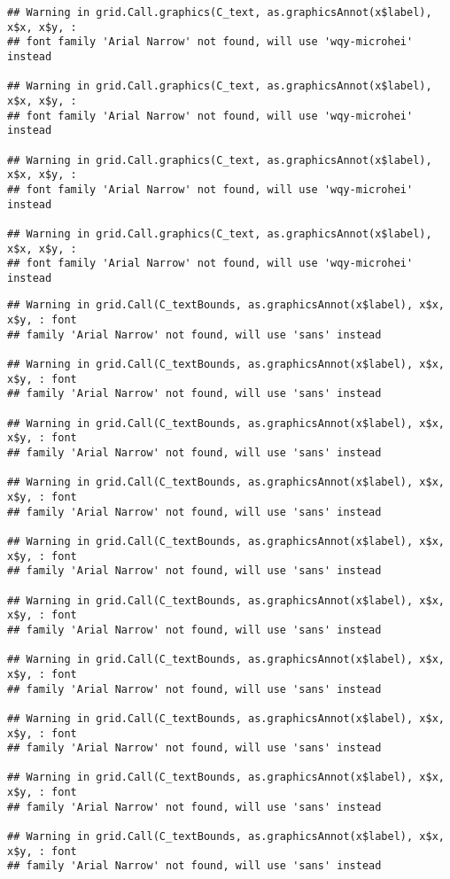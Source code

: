 \documentclass[
]{article}
\begin{document}
\begin{verbatim}
## Warning in grid.Call.graphics(C_text, as.graphicsAnnot(x$label), x$x, x$y, :
## font family 'Arial Narrow' not found, will use 'wqy-microhei' instead

## Warning in grid.Call.graphics(C_text, as.graphicsAnnot(x$label), x$x, x$y, :
## font family 'Arial Narrow' not found, will use 'wqy-microhei' instead

## Warning in grid.Call.graphics(C_text, as.graphicsAnnot(x$label), x$x, x$y, :
## font family 'Arial Narrow' not found, will use 'wqy-microhei' instead

## Warning in grid.Call.graphics(C_text, as.graphicsAnnot(x$label), x$x, x$y, :
## font family 'Arial Narrow' not found, will use 'wqy-microhei' instead
\end{verbatim}

\begin{verbatim}
## Warning in grid.Call(C_textBounds, as.graphicsAnnot(x$label), x$x, x$y, : font
## family 'Arial Narrow' not found, will use 'sans' instead

## Warning in grid.Call(C_textBounds, as.graphicsAnnot(x$label), x$x, x$y, : font
## family 'Arial Narrow' not found, will use 'sans' instead

## Warning in grid.Call(C_textBounds, as.graphicsAnnot(x$label), x$x, x$y, : font
## family 'Arial Narrow' not found, will use 'sans' instead

## Warning in grid.Call(C_textBounds, as.graphicsAnnot(x$label), x$x, x$y, : font
## family 'Arial Narrow' not found, will use 'sans' instead

## Warning in grid.Call(C_textBounds, as.graphicsAnnot(x$label), x$x, x$y, : font
## family 'Arial Narrow' not found, will use 'sans' instead

## Warning in grid.Call(C_textBounds, as.graphicsAnnot(x$label), x$x, x$y, : font
## family 'Arial Narrow' not found, will use 'sans' instead

## Warning in grid.Call(C_textBounds, as.graphicsAnnot(x$label), x$x, x$y, : font
## family 'Arial Narrow' not found, will use 'sans' instead

## Warning in grid.Call(C_textBounds, as.graphicsAnnot(x$label), x$x, x$y, : font
## family 'Arial Narrow' not found, will use 'sans' instead

## Warning in grid.Call(C_textBounds, as.graphicsAnnot(x$label), x$x, x$y, : font
## family 'Arial Narrow' not found, will use 'sans' instead

## Warning in grid.Call(C_textBounds, as.graphicsAnnot(x$label), x$x, x$y, : font
## family 'Arial Narrow' not found, will use 'sans' instead


\end{verbatim}
\end{document}
